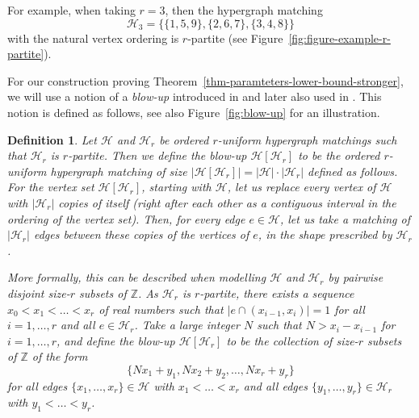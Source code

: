 \documentclass[11pt]{article}
\newtheorem{definition}[theorem]{Definition}
\theoremstyle{definition}
\numberwithin{equation}{section}
\numberwithin{figure}{section}
\newcommand{\Z}{\mathbb{Z}}
\newcommand{\HH}{\mathcal{H}}
\begin{document}
For example, when taking $r=3$, then the hypergraph matching
\[
\HH_3 = \{ \{1,5,9\}, \{2,6,7\} ,\{3, 4,8\}\}
\]
with the natural vertex ordering is $r$-partite (see Figure~\ref{fig:figure-example-r-partite}).

For our construction proving Theorem~\ref{thm-paramteters-lower-bound-stronger}, we will use a notion of a {\em blow-up} introduced in \cite{DGR22} and later also used in \cite{AJKS}. This notion is defined as follows, see also Figure~\ref{fig:blow-up} for an illustration.

\begin{definition}\label{def-blow-up}
    Let $\HH$ and $\HH_r$ be ordered $r$-uniform hypergraph matchings such that $\HH_r$ is $r$-partite. Then we define the blow-up $\HH[\HH_r]$ to be the ordered $r$-uniform hypergraph matching of size $|\HH[\HH_r]|=|\HH|\cdot |\HH_r|$ defined as follows. For the vertex set $\HH[\HH_r]$, starting with $\HH$, let us replace every vertex of $\HH$ with $|\HH_r|$ copies of itself (right after each other as a contiguous interval in the ordering of the vertex set). Then, for every edge $e\in \HH$, let us take a matching of $|\HH_r|$ edges between these copies of the vertices of $e$, in the shape prescribed by $\HH_r$.

    More formally, this can be described when modelling $\HH$ and $\HH_r$ by pairwise disjoint size-$r$ subsets of $\Z$. As $\HH_r$ is $r$-partite, there exists a sequence $x_0 < x_1 < \ldots < x_r$ of real numbers such that $|e\cap (x_{i-1},x_i)|=1$ for all $i=1,\dots,r$ and all $e\in \HH_r$. Take a large integer $N$ such that $N>x_i-x_{i-1}$ for $i=1,\dots,r$, and define the blow-up $\HH[\HH_r]$ to be the collection of size-$r$ subsets of $\Z$ of the form
    \[\{ N x_1 + y_1, N x_2 + y_2, \ldots, N x_r + y_r \}\]
    for all edges $\{x_1,\dots,x_r\}\in \HH$ with $x_1<\dots<x_r$ and all edges $\{y_1,\dots,y_r\}\in \HH_r$ with $y_1<\dots<y_r$.
\end{definition}
\end{document}
